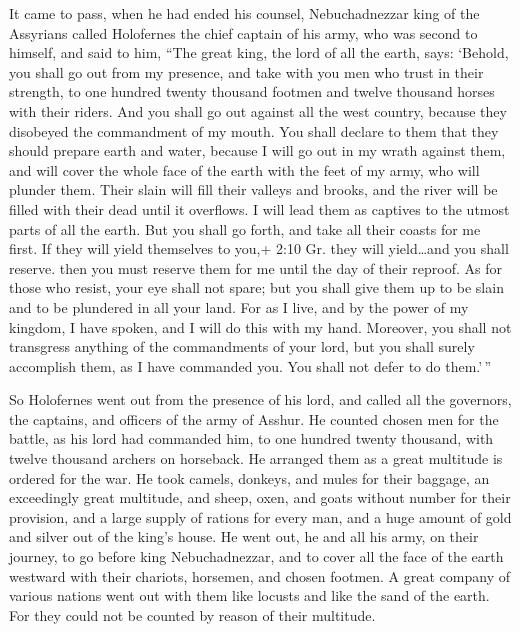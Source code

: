  It came to pass, when he had ended his counsel,
Nebuchadnezzar king of the Assyrians called Holofernes the chief captain
of his army, who was second to himself, and said to him, 
``The great king, the lord of all the earth, says: `Behold, you shall go
out from my presence, and take with you men who trust in their strength,
to one hundred twenty thousand footmen and twelve thousand horses with
their riders.  And you shall go out against all the west
country, because they disobeyed the commandment of my mouth.
 You shall declare to them that they should prepare earth
and water, because I will go out in my wrath against them, and will
cover the whole face of the earth with the feet of my army, who will
plunder them.  Their slain will fill their valleys and
brooks, and the river will be filled with their dead until it overflows.
 I will lead them as captives to the utmost parts of all the
earth.  But you shall go forth, and take all their coasts
for me first. If they will yield themselves to you,+ 2:10 Gr. they will
yield\ldots and you shall reserve. then you must reserve them for me
until the day of their reproof.  As for those who resist,
your eye shall not spare; but you shall give them up to be slain and to
be plundered in all your land.  For as I live, and by the
power of my kingdom, I have spoken, and I will do this with my hand.
 Moreover, you shall not transgress anything of the
commandments of your lord, but you shall surely accomplish them, as I
have commanded you. You shall not defer to do them.'\,''

 So Holofernes went out from the presence of his lord, and
called all the governors, the captains, and officers of the army of
Asshur.  He counted chosen men for the battle, as his lord
had commanded him, to one hundred twenty thousand, with twelve thousand
archers on horseback.  He arranged them as a great
multitude is ordered for the war.  He took camels, donkeys,
and mules for their baggage, an exceedingly great multitude, and sheep,
oxen, and goats without number for their provision,  and a
large supply of rations for every man, and a huge amount of gold and
silver out of the king's house.  He went out, he and all
his army, on their journey, to go before king Nebuchadnezzar, and to
cover all the face of the earth westward with their chariots, horsemen,
and chosen footmen.  A great company of various nations
went out with them like locusts and like the sand of the earth. For they
could not be counted by reason of their multitude.

